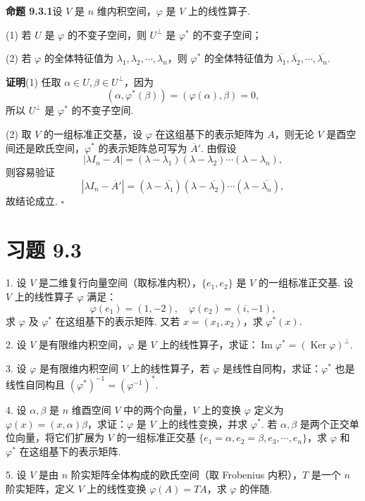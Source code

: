 \documentclass[UTF8, 12pt, fontset=fandol, oneside]{ctexart}
\begin{document}
\noindent\textbf{命题 9.3.1}\quad 设 $V$ 是 $n$ 维内积空间，$\varphi$ 是 $V$ 上的线性算子.

(1) 若 $U$ 是 $\varphi$ 的不变子空间，则 $U^\perp$ 是 $\varphi^*$ 的不变子空间；

(2) 若 $\varphi$ 的全体特征值为 $\lambda_1,\lambda_2,\cdots,\lambda_n$，则 $\varphi^*$ 的全体特征值为 $\overline{\lambda_1},\overline{\lambda_2},\cdots,\overline{\lambda_n}$.

\noindent\textbf{证明}\quad (1) 任取 $\alpha\in U,\beta\in U^\perp$，因为
\[
  (\alpha,\varphi^*(\beta))=(\varphi(\alpha),\beta)=0,
\]
所以 $U^\perp$ 是 $\varphi^*$ 的不变子空间.

(2) 取 $V$ 的一组标准正交基，设 $\varphi$ 在这组基下的表示矩阵为 $A$，则无论 $V$ 是酉空间还是欧氏空间，$\varphi^*$ 的表示矩阵总可写为 $\overline A'$. 由假设
\[
  |\lambda I_n-A|=(\lambda-\lambda_1)(\lambda-\lambda_2)\cdots(\lambda-\lambda_n),
\]
则容易验证
\[
  |\lambda I_n-\overline A'|=(\lambda-\overline{\lambda_1})(\lambda-\overline{\lambda_2})\cdots(\lambda-\overline{\lambda_n}),
\]
故结论成立. $\square$

\section*{习题 9.3}

1. 设 $V$ 是二维复行向量空间（取标准内积），$\{e_1,e_2\}$ 是 $V$ 的一组标准正交基. 设 $V$ 上的线性算子 $\varphi$ 满足：
\[
  \varphi(e_1)=(1,-2),\quad \varphi(e_2)=(i,-1),
\]
求 $\varphi$ 及 $\varphi^*$ 在这组基下的表示矩阵. 又若 $x=(x_1,x_2)$，求 $\varphi^*(x)$.

2. 设 $V$ 是有限维内积空间，$\varphi$ 是 $V$ 上的线性算子，求证：$\operatorname{Im}\varphi^*=(\operatorname{Ker}\varphi)^\perp$.

3. 设 $\varphi$ 是有限维内积空间 $V$ 上的线性算子，若 $\varphi$ 是线性自同构，求证：$\varphi^*$ 也是线性自同构且 $(\varphi^*)^{-1}=(\varphi^{-1})^*$.

4. 设 $\alpha,\beta$ 是 $n$ 维酉空间 $V$ 中的两个向量，$V$ 上的变换 $\varphi$ 定义为 $\varphi(x)=(x,\alpha)\beta$，求证：$\varphi$ 是 $V$ 上的线性变换，并求 $\varphi^*$. 若 $\alpha,\beta$ 是两个正交单位向量，将它们扩展为 $V$ 的一组标准正交基 $\{e_1=\alpha,e_2=\beta,e_3,\cdots,e_n\}$，求 $\varphi$ 和 $\varphi^*$ 在这组基下的表示矩阵.

5. 设 $V$ 是由 $n$ 阶实矩阵全体构成的欧氏空间（取 Frobenius 内积），$T$ 是一个 $n$ 阶实矩阵，定义 $V$ 上的线性变换 $\varphi(A)=TA$，求 $\varphi$ 的伴随.
\end{document}
